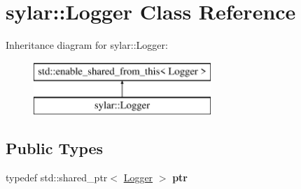 \hypertarget{classsylar_1_1Logger}{\section{sylar\-:\-:Logger Class Reference}
\label{classsylar_1_1Logger}
}
Inheritance diagram for sylar\-:\-:Logger\-:\begin{figure}[H]
\begin{center}
\leavevmode
\includegraphics[height=2.000000cm]{classsylar_1_1Logger}
\end{center}
\end{figure}
\subsection*{Public Types}
\begin{DoxyCompactItemize}
\item 
\hypertarget{classsylar_1_1Logger_a947f09bae8ec3d783a1f60231f6b6cd3}{typedef std\-::shared\-\_\-ptr$<$ \hyperlink{classsylar_1_1Logger}{Logger} $>$ {\bfseries ptr}}\label{classsylar_1_1Logger_a947f09bae8ec3d783a1f60231f6b6cd3}

\end{DoxyCompactItemize}
